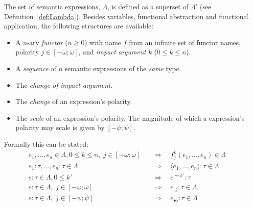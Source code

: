 \begin{definition}
The set of semantic expressions, $\Lambda$, is defined as a superset of $\Lambda$' (see Definition~\ref{def:Lambda}). Besides variables, functional abstraction and functional application, the following structures are available:
\begin{itemize}
  \item A $n$-ary \emph{functor} ($n \geq 0$) with name $f$ from an infinite set of functor names, polarity $j \in [-\omega;\omega]$, and \emph{impact argument} $k$ ($0 \leq k \leq n$).
  \item A \emph{sequence} of $n$ semantic expressions of the \emph{same} type.
  \item The \emph{change of impact argument}.
  \item The \emph{change} of an expression's polarity.
  \item The \emph{scale} of an expression's polarity. The magnitude of which a expression's polarity may scale is given by $[-\psi; \psi]$.
\end{itemize}

Formally this can be stated:
\begin{align}
 e_1, \ldots, e_n \in \Lambda, 0 \leq k \leq n, \; j \in [-\omega;\omega]         &\quad \Rightarrow \quad f^k_j(e_1, \ldots, e_n) \in \Lambda \tag{Functor} \\
 e_1 : \tau, \ldots, e_n : \tau \in \Lambda     &\quad \Rightarrow \quad  \langle e_1, \ldots, e_n \rangle  : \tau \in \Lambda \tag{Sequence} \\
 e : \tau \in \Lambda, 0 \leq k' &\quad \Rightarrow \quad e^{\leadsto k'} : \tau \tag{Impact change} \\
 e : \tau \in \Lambda, \; j \in [-\omega;\omega]      &\quad \Rightarrow \quad  e_{\circ
 j}  : \tau \in \Lambda \tag{Change}  \\ 
 e : \tau \in \Lambda, \; j \in [-\psi;\psi]      &\quad \Rightarrow \quad  e_{\bullet j}  : \tau \in \Lambda \tag{Scale} 
\end{align}
\vspace{.3em}
\label{def:semanticExpressions}
\done
\end{definition}

